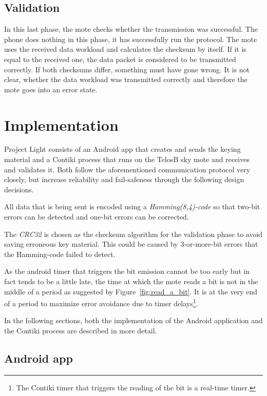 \documentclass{sig-alternate} %
\begin{document}
\subsection{Validation}
\label{sub:validation}

In this last phase, the mote checks whether the transmission was successful.
The phone does nothing in this phase, it has successfully run the protocol.
The mote uses the received data workload and calculates the checksum by itself.
If it is equal to the received one, the data packet is considered to be transmitted correctly.
If both checksums differ, something must have gone wrong.
It is not clear, whether the data workload was transmitted correctly and therefore the mote goes into an error state.

\section{Implementation}
\label{sec:implementation}

Project Light consists of an Android app that creates and sends the keying material and a Contiki\cite{dunkels04contiki} process that runs on the TelosB sky mote and receives and validates it.
Both follow the aforementioned communication protocol very closely, but increase reliability and fail-safeness through the following design decisions.

All data that is being sent is encoded using a \textit{Hamming(8,4)-code} so that two-bit errors can be detected and one-bit errors can be corrected.

The \textit{CRC32} is chosen as the checksum algorithm for the validation phase to avoid saving erroneous key material.
This could be caused by 3-or-more-bit errors that the Hamming-code failed to detect.

As the android timer that triggers the bit emission cannot be too early but in fact tends to be a little late\cite{mongia2010reliable}, the time at which the mote reads a bit is not in the middle of a period as suggested by Figure~\ref{fig:read_a_bit}.
It is at the very end of a period to maximize error avoidance due to timer delays\footnote{The Contiki timer that triggers the reading of the bit is a real-time timer.}.

In the following sections, both the implementation of the Android application and the Contiki process are described in more detail.

\subsection{Android app}
\label{sub:android_app}
\end{document}
